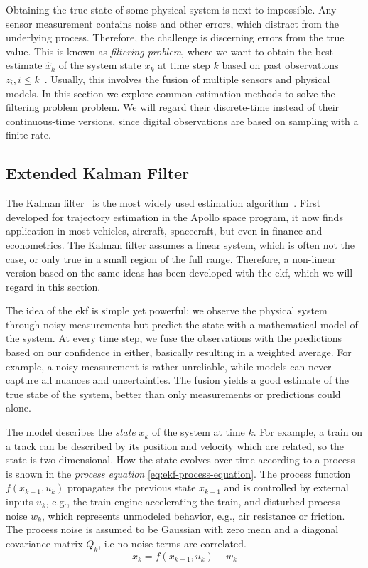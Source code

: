 Obtaining the true state of some physical system is next to impossible. Any sensor measurement contains noise and other errors, which distract from the underlying process. Therefore, the challenge is discerning errors from the true value. This is known as \textit{filtering problem}, where we want to obtain the best estimate $\hat{x}_k$ of the system state $x_k$ at time step $k$ based on past observations $z_i, i \leq k$~\cite[p.~67]{Mitter.1996}. Usually, this involves the fusion of multiple sensors and physical models. In this section we explore common estimation methods to solve the filtering problem problem. We will regard their discrete-time instead of their continuous-time versions, since digital observations are based on sampling with a finite rate.

\subsection{Extended Kalman Filter}
The Kalman filter~\cite{Kalman.1960} is the most widely used estimation algorithm~\cite[p.~401]{Julier.2004}. First developed for trajectory estimation in the Apollo space program, it now finds application in most vehicles, aircraft, spacecraft, but even in finance and econometrics. The Kalman filter assumes a linear system, which is often not the case, or only true in a small region of the full range. Therefore, a non-linear version based on the same ideas has been developed with the \gls{ekf}, which we will regard in this section.

The idea of the \gls{ekf} is simple yet powerful: we observe the physical system through noisy measurements but predict the state with a mathematical model of the system. At every time step, we fuse the observations with the predictions based on our confidence in either, basically resulting in a weighted average. For example, a noisy measurement is rather unreliable, while models can never capture all nuances and uncertainties. The fusion yields a good estimate of the true state of the system, better than only measurements or predictions could alone.

The model describes the \textit{state} $x_k$ of the system at time $k$. For example, a train on a track can be described by its position and velocity which are related, so the state is two-dimensional. How the state evolves over time according to a process is shown in the \textit{process equation} \ref{eq:ekf-process-equation}. The process function $f(x_{k-1}, u_k)$ propagates the previous state $x_{k-1}$ and is controlled by external inputs $u_k$, e.g., the train engine accelerating the train, and disturbed process noise $w_k$, which represents unmodeled behavior, e.g., air resistance or friction. The process noise is assumed to be Gaussian with zero mean and a diagonal covariance matrix $Q_k$, i.e no noise terms are correlated.
\begin{equation}\label{eq:ekf-process-equation}%
x_k = f(x_{k-1}, u_k) + w_k%
\end{equation}

